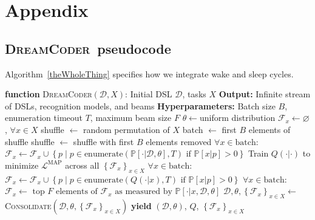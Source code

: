 \documentclass{article}
\newcommand{\system}{\textsc{DreamCoder}~}
\newcommand{\systemEnding}{\textsc{DreamCoder}}
\newcommand{\probability}{\mathds{P}} %
\begin{document}



\appendix

\section{Appendix}

\subsection{\system pseudocode}\label{systemPseudocode}

Algorithm~\ref{theWholeThing} specifies how we integrate wake and sleep cycles.
\begin{algorithm}
  \caption{Full \system algorithm}\label{theWholeThing}
  \begin{algorithmic}[1]
    \State \textbf{function} \systemEnding$(\mathcal{D}, X)$:
     Initial DSL $\mathcal{D}$, tasks $X$
    \State \textbf{Output:} Infinite stream of DSLs, recognition models, and beams
    \State \textbf{Hyperparameters:} Batch size $B$, enumeration timeout $T$, maximum beam size $F$
    \State $\theta\gets $uniform distribution
    \State $\mathcal{F}_x\gets\varnothing $, $\forall x\in X$
    \State shuffle $\gets$ random permutation of $X$
    \State batch $\gets$ first $B$ elements of shuffle
    \State shuffle $\gets$ shuffle with first $B$ elements removed
    \State $\forall x\in \text{batch}$: $\mathcal{F}_x\gets\mathcal{F}_x\cup \left\{p\;|\;p\in \text{enumerate}(\probability[\cdot |\mathcal{D},\theta],T)\text{ if }\probability[x|p] > 0 \right\}$
    \State Train $Q(\cdot |\cdot )$ to minimize $\mathcal{L}^{\text{MAP}}$ across all $\left\{\mathcal{F}_x \right\}_{x\in X}$
    \State $\forall x\in \text{batch}$: $\mathcal{F}_x\gets\mathcal{F}_x\cup \left\{p\;|\;p\in \text{enumerate}(Q(\cdot |x),T)\text{ if }\probability[x|p] > 0 \right\}$
    \State $\forall x\in \text{batch}$: $\mathcal{F}_x\gets\text{ top }F\text{ elements of }\mathcal{F}_x\text{ as measured by }\probability[\cdot |x,\mathcal{D},\theta]$
    \State $\mathcal{D},\theta,\left\{\mathcal{F}_x \right\}_{x\in X}\gets $\textsc{Consolidate}$(\mathcal{D},\theta,\left\{\mathcal{F}_x \right\}_{x\in X})$
    \State \textbf{yield} $(\mathcal{D},\theta)$, $Q$, $\left\{\mathcal{F}_x \right\}_{x\in X}$ 
    \EndWhile
    \EndWhile

  \end{algorithmic}
\end{algorithm}
\end{document}
